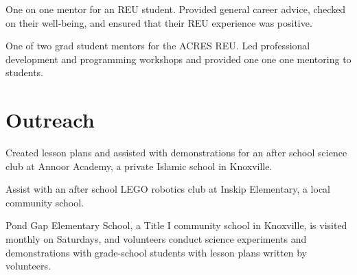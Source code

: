 \documentclass[letterpaper]{deedy-resume} %
\begin{document}

One on one mentor for an REU student. Provided general career advice, checked on their well-being, and ensured that their REU experience was positive.
\sectionspace %



One of two grad student mentors for the ACRES REU. Led professional development and programming workshops and provided one one one mentoring to students.
\sectionspace %





\section{Outreach}


Created lesson plans and assisted with demonstrations for an after school science club at Annoor Academy, a private Islamic school in Knoxville.
\sectionspace %



Assist with an after school LEGO robotics club at Inskip Elementary, a local community school.
\sectionspace %



Pond Gap Elementary School, a Title I community school in Knoxville, is visited monthly on Saturdays, and volunteers conduct science experiments and demonstrations with grade-school students with lesson plans written by volunteers.
\sectionspace %
\end{document}
